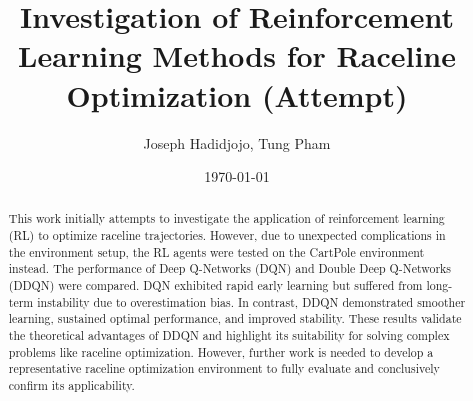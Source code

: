 \documentclass{article}
\title{Investigation of Reinforcement Learning Methods for Raceline Optimization (Attempt)}
\author{Joseph Hadidjojo, Tung Pham}
\date{\today}
\begin{document}
\maketitle

\begin{abstract}
    This work initially attempts to investigate the application of reinforcement learning (RL) to optimize raceline trajectories. However, due to unexpected complications in the environment setup, the RL agents were tested on the CartPole environment instead. The performance of Deep Q-Networks (DQN) and Double Deep Q-Networks (DDQN) were compared. DQN exhibited rapid early learning but suffered from long-term instability due to overestimation bias. In contrast, DDQN demonstrated smoother learning, sustained optimal performance, and improved stability. These results validate the theoretical advantages of DDQN and highlight its suitability for solving complex problems like raceline optimization. However, further work is needed to develop a representative raceline optimization environment to fully evaluate and conclusively confirm its applicability.
\end{abstract}

\end{document}
